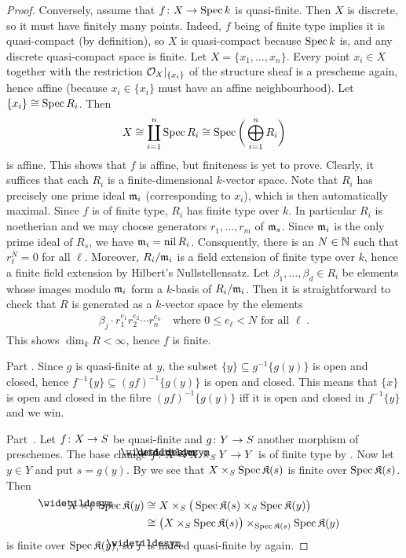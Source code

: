 \documentclass[a4paper,parskip=half,numbers=enddot, DIV=12]{scrreprt}
\renewcommand{\leq}{\leqslant}
\begin{document}
\begin{proof}
	Conversely, assume that $f\colon X\morphism\Spec k$ is quasi-finite. Then $X$ is discrete, so it must have finitely many points. Indeed, $f$ being of finite type implies it is quasi-compact (by definition), so $X$ is quasi-compact because $\operatorname{Spec} k$ is, and any discrete quasi-compact space is finite. Let $X=\{x_1,\ldots,x_n\}$. Every point $x_i\in X$ together with the restriction $\mathcal{O}_X|_{\{x_i\}}$ of the structure sheaf is a prescheme again, hence affine (because $x_i\in\{x_i\}$ must have an affine neighbourhood). Let $\{x_i\}\cong \operatorname{Spec} R_i$. Then
	\begin{align*}
		X\cong\coprod_{i=1}^n\operatorname{Spec} R_i\cong\operatorname{Spec}\bigg(\bigoplus_{i=1}^nR_i\bigg)
	\end{align*}
	is affine. This shows that $f$ is affine, but finiteness is yet to prove. Clearly, it suffices that each $R_i$ is a finite-dimensional $k$-vector space. Note that $R_i$ has precisely one prime ideal $\mathfrak{m}_i$ (corresponding to $x_i$), which is then automatically maximal. Since $f$ is of finite type, $R_i$ has finite type over $k$. In particular $R_i$ is noetherian and we may choose generators $r_1,\ldots,r_m$ of $\mathfrak{m}_s$. Since $\mathfrak{m}_i$ is the only prime ideal of $R_s$, we have $\mathfrak{m}_i=\operatorname{nil} R_i$. Consquently, there is an $N\in\mathbb{N}$ such that $r_\ell^N=0$ for all $\ell$. Moreover, $R_i/\mathfrak{m}_i$ is a field extension of finite type over $k$, hence a finite field extension by Hilbert's Nullstellensatz. Let $\beta_1,\ldots,\beta_d\in R_i$ be elements whose images modulo $\mathfrak{m}_i$ form a $k$-basis of $R_i/\mathfrak{m}_i$. Then it is straightforward to check that $R$ is generated as a $k$-vector space by the elements
	\begin{align*}
	\beta_j\cdot r_1^{e_1}r_2^{e_2}\cdots r_n^{e_n}\quad\text{where }0\leq e_\ell<N\text{ for all }\ell\;.
	\end{align*}
	This shows $\dim_kR<\infty$, hence $f$ is finite.
	
	Part . Since $g$ is quasi-finite at $y$, the subset $\{y\}\subseteq g^{-1}\{g(y)\}$ is open and closed, hence $f^{-1}\{y\}\subseteq (gf)^{-1}\{g(y)\}$ is open and closed. This means that $\{x\}$ is open and closed in the fibre $(gf)^{-1}\{g(y)\}$  iff it is open and closed in $f^{-1}\{y\}$ and we win.
	
	Part~. Let $f\colon X\morphism S$ be quasi-finite and $g\colon Y\morphism S$ another morphism of preschemes. The base change $\snake{f}\colon \snake{X}=X\times_SY\morphism Y$ is of finite type by \cite[Fact~2.2.2]{alggeo1}. Now let $y\in Y$ and put $s=g(y)$. By  we see that $X\times_S\operatorname{Spec} \mathfrak{K}(s)$ is finite over $\operatorname{Spec} \mathfrak{K}(s)$. Then
	\begin{align*}
		\snake{X}\times_Y\Spec\KK(y)&\cong X\times_S\big(\Spec\KK(s)\times_S\Spec\KK(y)\big)\\
		&\cong \big(X\times_S\Spec \KK(s)\big)\times_{\Spec \KK(s)}\Spec \KK(y)
	\end{align*}
	is finite over $\operatorname{Spec}\mathfrak{K}(y)$, so $\snake{f}$ is indeed quasi-finite by  again.
\end{proof}
\end{document}
